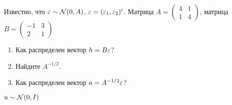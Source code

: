 \begin{problem}
Известно, что $\varepsilon\sim \mathcal{N}(0,A)$, $\varepsilon=(\varepsilon_1,\varepsilon_2)'$. Матрица $A=\left(\begin{matrix}
4 & 1 \\
1 & 4
\end{matrix}\right)$, матрица $B=\left(\begin{matrix}
-1 & 3 \\
2 & 1
\end{matrix}\right)$
\begin{enumerate}
\item Как распределен вектор $h=B\varepsilon$?
\item Найдите $A^{-1/2}$.
\item Как распределен вектор $u=A^{-1/2}\varepsilon$?
\end{enumerate}


\begin{sol}
$u\sim \mathcal{N}(0,I)$
\end{sol}
\end{problem}


